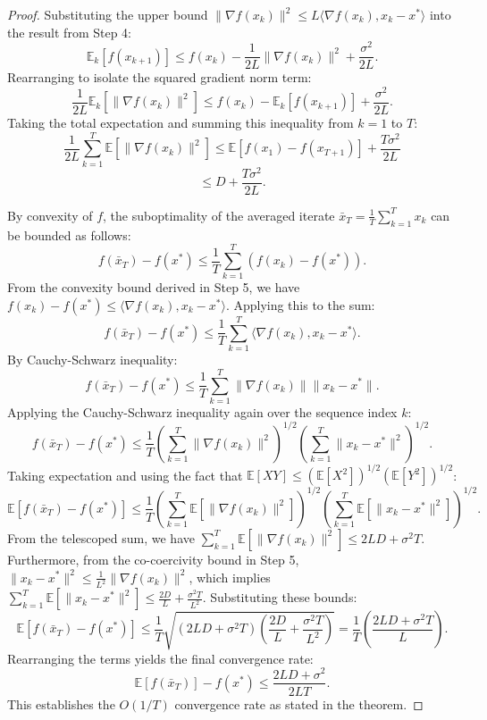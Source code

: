 \documentclass[11pt]{article}
\begin{document}
\begin{proof}
Substituting the upper bound $\|\nabla f(x_k)\|^2 \le L \langle \nabla f(x_k), x_k - x^* \rangle$ into the result from Step 4:
\[
\mathbb{E}_k[f(x_{k+1})] \le f(x_k) - \frac{1}{2L} \|\nabla f(x_k)\|^2 + \frac{\sigma^2}{2L}.
\]
Rearranging to isolate the squared gradient norm term:
\[
\frac{1}{2L} \mathbb{E}_k[\|\nabla f(x_k)\|^2] \le f(x_k) - \mathbb{E}_k[f(x_{k+1})] + \frac{\sigma^2}{2L}.
\]
Taking the total expectation and summing this inequality from $k=1$ to $T$:
\[
\frac{1}{2L} \sum_{k=1}^T \mathbb{E}[\|\nabla f(x_k)\|^2] \le \mathbb{E}[f(x_1) - f(x_{T+1})] + \frac{T \sigma^2}{2L}
\]
\[
\le D + \frac{T \sigma^2}{2L}.
\]

By convexity of $f$, the suboptimality of the averaged iterate $\bar{x}_T = \frac{1}{T}\sum_{k=1}^T x_k$ can be bounded as follows:
\[
f(\bar{x}_T) - f(x^*) \le \frac{1}{T} \sum_{k=1}^T (f(x_k) - f(x^*)).
\]
From the convexity bound derived in Step 5, we have $f(x_k) - f(x^*) \le \langle \nabla f(x_k), x_k - x^* \rangle$. Applying this to the sum:
\[
f(\bar{x}_T) - f(x^*) \le \frac{1}{T} \sum_{k=1}^T \langle \nabla f(x_k), x_k - x^* \rangle.
\]
By Cauchy-Schwarz inequality:
\[
f(\bar{x}_T) - f(x^*) \le \frac{1}{T} \sum_{k=1}^T \|\nabla f(x_k)\| \|x_k - x^*\|.
\]
Applying the Cauchy-Schwarz inequality again over the sequence index $k$:
\[
f(\bar{x}_T) - f(x^*) \le \frac{1}{T} \left( \sum_{k=1}^T \|\nabla f(x_k)\|^2 \right)^{1/2} \left( \sum_{k=1}^T \|x_k - x^*\|^2 \right)^{1/2}.
\]
Taking expectation and using the fact that $\mathbb{E}[XY] \le (\mathbb{E}[X^2])^{1/2} (\mathbb{E}[Y^2])^{1/2}$:
\[
\mathbb{E}[f(\bar{x}_T) - f(x^*)] \le \frac{1}{T} \left( \sum_{k=1}^T \mathbb{E}[\|\nabla f(x_k)\|^2] \right)^{1/2} \left( \sum_{k=1}^T \mathbb{E}[\|x_k - x^*\|^2] \right)^{1/2}.
\]
From the telescoped sum, we have $\sum_{k=1}^T \mathbb{E}[\|\nabla f(x_k)\|^2] \le 2LD + \sigma^2 T$. Furthermore, from the co-coercivity bound in Step 5, $\|x_k - x^*\|^2 \le \frac{1}{L^2} \|\nabla f(x_k)\|^2$, which implies $\sum_{k=1}^T \mathbb{E}[\|x_k - x^*\|^2] \le \frac{2D}{L} + \frac{\sigma^2 T}{L^2}$. Substituting these bounds:
\[
\mathbb{E}[f(\bar{x}_T) - f(x^*)] \le \frac{1}{T} \sqrt{(2LD + \sigma^2 T) \left(\frac{2D}{L} + \frac{\sigma^2 T}{L^2}\right)} = \frac{1}{T} \left( \frac{2LD + \sigma^2 T}{L} \right).
\]
Rearranging the terms yields the final convergence rate:
\[
\mathbb{E}[f(\bar{x}_T)] - f(x^*) \le \frac{2LD + \sigma^2}{2LT}.
\]
This establishes the $O(1/T)$ convergence rate as stated in the theorem.
\end{proof}
\end{document}
